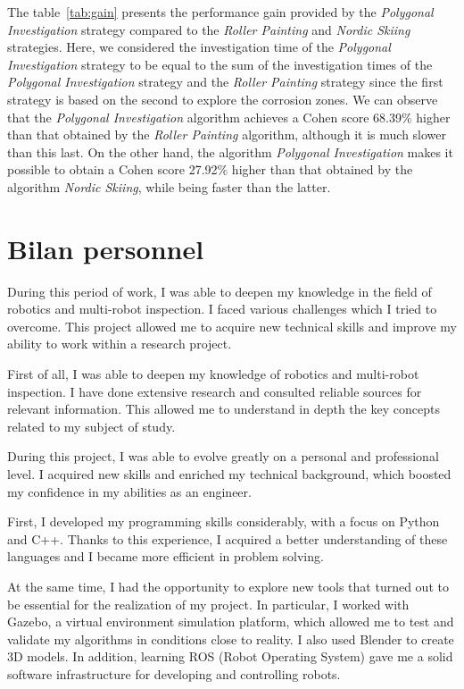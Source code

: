 \documentclass[english,RandD]{rapportPFE}  %
\begin{document}
			The table~\ref{tab:gain} presents the performance gain provided by the \textit{Polygonal Investigation} strategy compared to the \textit{Roller Painting} and \textit{Nordic Skiing} strategies.
			Here, we considered the investigation time of the \textit{Polygonal Investigation} strategy to be equal to the sum of the investigation times of the \textit{Polygonal Investigation} strategy and the \textit{Roller Painting} strategy since the first strategy is based on the second to explore the corrosion zones.
			We can observe that the \textit{Polygonal Investigation} algorithm achieves a Cohen score 68.39\% higher than that obtained by the \textit{Roller Painting} algorithm, although it is much slower than this last.
			On the other hand, the algorithm \textit{Polygonal Investigation} makes it possible to obtain a Cohen score 27.92\% higher than that obtained by the algorithm \textit{Nordic Skiing}, while being faster than the latter.
	\section{Bilan personnel}
		During this period of work, I was able to deepen my knowledge in the field of robotics and multi-robot inspection.
		I faced various challenges which I tried to overcome.
		This project allowed me to acquire new technical skills and improve my ability to work within a research project.

		First of all, I was able to deepen my knowledge of robotics and multi-robot inspection.
		I have done extensive research and consulted reliable sources for relevant information.
		This allowed me to understand in depth the key concepts related to my subject of study.

		During this project, I was able to evolve greatly on a personal and professional level.
		I acquired new skills and enriched my technical background, which boosted my confidence in my abilities as an engineer.

		First, I developed my programming skills considerably, with a focus on Python and C++.
		Thanks to this experience, I acquired a better understanding of these languages and I became more efficient in problem solving.

		At the same time, I had the opportunity to explore new tools that turned out to be essential for the realization of my project.
		In particular, I worked with Gazebo, a virtual environment simulation platform, which allowed me to test and validate my algorithms in conditions close to reality.
		I also used Blender to create 3D models. In addition, learning ROS (Robot Operating System) gave me a solid software infrastructure for developing and controlling robots.
\end{document}
